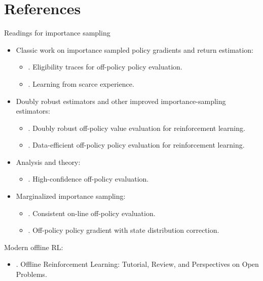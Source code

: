 \section{References}
Readings for importance sampling
\begin{itemize}
	\item Classic work on importance sampled policy gradients and return estimation:
	\begin{itemize}
		\item {}. Eligibility traces for off-policy policy evaluation.
		\item {}. Learning from scarce experience.
	\end{itemize}
	\item Doubly robust estimators and other improved importance-sampling estimators:
	\begin{itemize}
		\item {}. Doubly robust off-policy value evaluation for reinforcement learning.
		\item {}. Data-efficient off-policy policy evaluation for reinforcement learning.
	\end{itemize}	
	\item Analysis and theory:
	\begin{itemize}
		\item {}. High-confidence off-policy evaluation.
	\end{itemize}
	\item Marginalized importance sampling:
	\begin{itemize}
		\item {}. Consistent on-line off-policy evaluation. 
		\item {}. Off-policy policy gradient with state distribution correction.
	\end{itemize}
\end{itemize}

Modern offline \ac{RL}:
\begin{itemize}
	\item {}. Offline Reinforcement Learning: Tutorial, Review, and Perspectives on Open Problems.
\end{itemize}